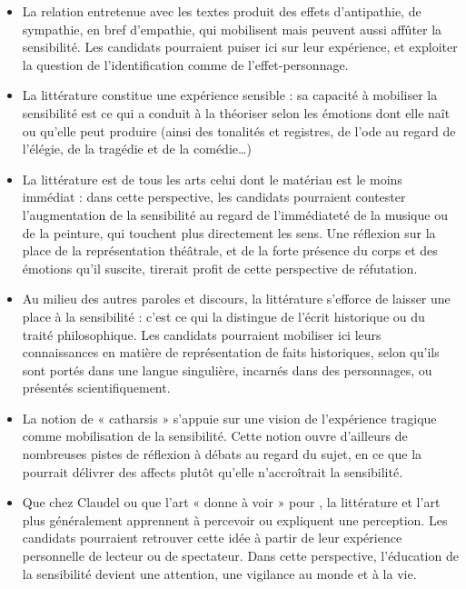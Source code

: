 {\begin{itemize}
\item La relation entretenue avec les textes produit des effets d’antipathie, de
sympathie, en bref d’empathie, qui mobilisent mais peuvent aussi affûter la
sensibilité. Les candidats pourraient puiser ici sur leur expérience, et
exploiter la question de l’identification comme de l’effet-personnage.

\item La littérature constitue une expérience sensible : sa capacité à mobiliser la
sensibilité est ce qui a conduit à la théoriser selon les émotions dont elle naît
ou qu’elle peut produire (ainsi des tonalités et registres, de l’ode au regard
de l’élégie, de la tragédie et de la comédie…)

\item La littérature est de tous les arts celui dont le matériau est le moins
immédiat : dans cette perspective, les candidats pourraient contester
l’augmentation de la sensibilité au regard de l’immédiateté de la musique ou
de la peinture, qui touchent plus directement les sens. Une réflexion sur la
place de la représentation théâtrale, et de la forte présence du corps et des
émotions qu’il suscite, tirerait profit de cette perspective de réfutation.

\item Au milieu des autres paroles et discours, la littérature s’efforce de laisser
une place à la sensibilité : c’est ce qui la distingue de l’écrit historique ou du
traité philosophique. Les candidats pourraient mobiliser ici leurs
connaissances en matière de représentation de faits historiques, selon qu’ils
sont portés dans une langue singulière, incarnés dans des personnages, ou
présentés scientifiquement.

\item La notion de « catharsis » s’appuie sur une vision de l’expérience tragique
comme mobilisation de la sensibilité. Cette notion ouvre d’ailleurs de
nombreuses pistes de réflexion à débats au regard du sujet, en ce que la
 pourrait délivrer des affects plutôt qu’elle n’accroîtrait la
sensibilité.

\item Que  chez Claudel ou que l’art « donne à voir » pour ,
la littérature et l’art plus généralement apprennent à percevoir ou expliquent
une perception. Les candidats pourraient retrouver cette idée à partir de leur
expérience personnelle de lecteur ou de spectateur. Dans cette perspective,
l’éducation de la sensibilité devient une attention, une vigilance au monde et
à la vie.
\end{itemize}

}
